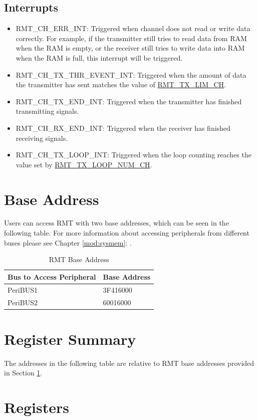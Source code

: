 \documentclass[main\_\_EN.tex]{subfiles}
\begin{document}
\subsection{Interrupts}
\begin{itemize}
\item \label{int:RMTCHnERRINT}RMT\_CH\_ERR\_INT: Triggered when channel  does not read or write data correctly. For example, if the transmitter still tries to read data from RAM when the RAM is empty, or the receiver still tries to write data into RAM when the RAM is full, this interrupt will be triggered.
\item \label{int:RMTCHnTXTHREVENTINT}RMT\_CH\_TX\_THR\_EVENT\_INT: Triggered when the amount of data the transmitter has sent matches the value of \hyperref[fielddesc:RMTREGTXLIMCHN]{RMT\_TX\_LIM\_CH}.
\item \label{int:RMTCHnTXENDINT}RMT\_CH\_TX\_END\_INT: Triggered when the transmitter has finished transmitting signals.
\item \label{int:RMTCHnRXENDINT}RMT\_CH\_RX\_END\_INT: Triggered when the receiver has finished receiving signals.
\item \label{int:RMTCHnTXLOOPINT}RMT\_CH\_TX\_LOOP\_INT: Triggered when the loop counting reaches the value set by \hyperref[fielddesc:RMTREGTXLOOPNUMCHN]{RMT\_TX\_LOOP\_NUM\_CH}.
\end{itemize}

\section{Base Address}\label{RMT_BASE_ADDRESS}
Users can access RMT with two base addresses, which can be seen in the following table. For more information about accessing peripherals from different buses please see Chapter \ref{mod:sysmem}: \textit{}.

\begin{longtable}[c]{ | l | C{3cm} | }
\caption{RMT Base Address} \label{table:rmt_base_address}
\\ \hline
{}
Bus to Access Peripheral & Base Address \\
    \hline
PeriBUS1 & \hexprefix{}3F416000 \\
    \hline
PeriBUS2 & \hexprefix{}60016000 \\
    \hline
\end{longtable}

\hypertarget{rmt-reg-summ}{}
\section{Register Summary}

The addresses in the following table are relative to RMT base addresses provided in Section \ref{RMT_BASE_ADDRESS}.


\section{Registers}

\end{document}
